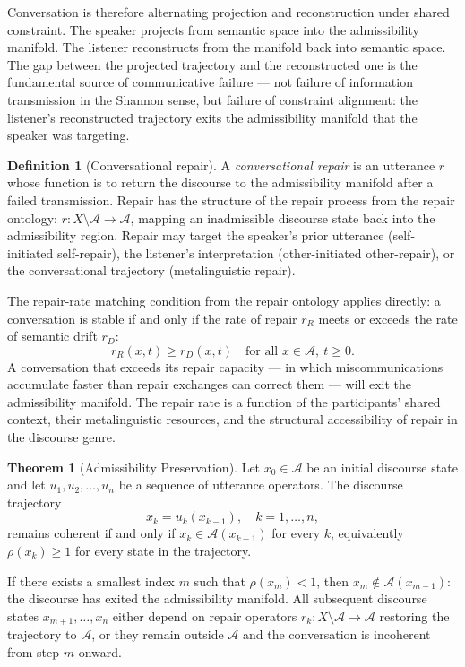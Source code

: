 \documentclass[11pt, a4paper]{article}
\theoremstyle{definition}
\newtheorem{definition}{Definition}
\newtheorem{theorem}{Theorem}
\theoremstyle{remark}
\begin{document}
Conversation is therefore alternating projection and reconstruction under
shared constraint. The speaker projects from semantic space into the
admissibility manifold. The listener reconstructs from the manifold back into
semantic space. The gap between the projected trajectory and the reconstructed
one is the fundamental source of communicative failure --- not failure of
information transmission in the Shannon sense, but failure of constraint
alignment: the listener's reconstructed trajectory exits the admissibility
manifold that the speaker was targeting.

\begin{definition}[Conversational repair]
A \textit{conversational repair} is an utterance $r$ whose function is to
return the discourse to the admissibility manifold after a failed transmission.
Repair has the structure of the repair process from the repair ontology:
$r: X \setminus \mathcal{A} \to \mathcal{A}$, mapping an inadmissible
discourse state back into the admissibility region. Repair may target the
speaker's prior utterance (self-initiated self-repair), the listener's
interpretation (other-initiated other-repair), or the conversational
trajectory (metalinguistic repair).
\end{definition}

The repair-rate matching condition from the repair ontology applies directly:
a conversation is stable if and only if the rate of repair $r_R$ meets or
exceeds the rate of semantic drift $r_D$:
\[
r_R(x, t) \geq r_D(x, t) \quad \text{for all } x \in \mathcal{A},\ t \geq 0.
\]
A conversation that exceeds its repair capacity --- in which miscommunications
accumulate faster than repair exchanges can correct them --- will exit the
admissibility manifold. The repair rate is a function of the participants'
shared context, their metalinguistic resources, and the structural accessibility
of repair in the discourse genre.

\begin{theorem}[Admissibility Preservation]
Let $x_0 \in \mathcal{A}$ be an initial discourse state and let
$u_1, u_2, \ldots, u_n$ be a sequence of utterance operators. The discourse
trajectory
\[
x_k = u_k(x_{k-1}), \quad k = 1, \ldots, n,
\]
remains coherent if and only if $x_k \in \mathcal{A}(x_{k-1})$ for every $k$,
equivalently $\rho(x_k) \geq 1$ for every state in the trajectory.

If there exists a smallest index $m$ such that $\rho(x_m) < 1$, then
$x_m \notin \mathcal{A}(x_{m-1})$: the discourse has exited the admissibility
manifold. All subsequent discourse states $x_{m+1}, \ldots, x_n$ either
depend on repair operators $r_k: X \setminus \mathcal{A} \to \mathcal{A}$
restoring the trajectory to $\mathcal{A}$, or they remain outside
$\mathcal{A}$ and the conversation is incoherent from step $m$ onward.
\end{theorem}
\end{document}
